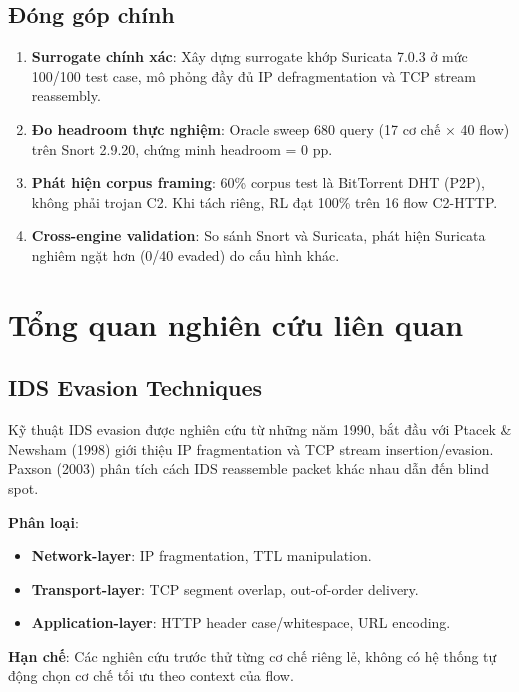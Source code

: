 \documentclass[12pt, a4paper, openany]{book}
\begin{document}
\section{Đóng góp chính}

\begin{enumerate}
    \item \textbf{Surrogate chính xác}: Xây dựng surrogate khớp Suricata 7.0.3 ở mức 100/100 test case, mô phỏng đầy đủ IP defragmentation và TCP stream reassembly.
    
    \item \textbf{Đo headroom thực nghiệm}: Oracle sweep 680 query (17 cơ chế × 40 flow) trên Snort 2.9.20, chứng minh headroom = 0 pp.
    
    \item \textbf{Phát hiện corpus framing}: 60\% corpus test là BitTorrent DHT (P2P), không phải trojan C2. Khi tách riêng, RL đạt 100\% trên 16 flow C2-HTTP.
    
    \item \textbf{Cross-engine validation}: So sánh Snort và Suricata, phát hiện Suricata nghiêm ngặt hơn (0/40 evaded) do cấu hình khác.
\end{enumerate}

\chapter{Tổng quan nghiên cứu liên quan}

\section{IDS Evasion Techniques}

Kỹ thuật IDS evasion được nghiên cứu từ những năm 1990, bắt đầu với Ptacek \& Newsham (1998) giới thiệu IP fragmentation và TCP stream insertion/evasion. Paxson (2003) phân tích cách IDS reassemble packet khác nhau dẫn đến blind spot.

\textbf{Phân loại}:
\begin{itemize}
    \item \textbf{Network-layer}: IP fragmentation, TTL manipulation.
    \item \textbf{Transport-layer}: TCP segment overlap, out-of-order delivery.
    \item \textbf{Application-layer}: HTTP header case/whitespace, URL encoding.
\end{itemize}

\textbf{Hạn chế}: Các nghiên cứu trước thử từng cơ chế riêng lẻ, không có hệ thống tự động chọn cơ chế tối ưu theo context của flow.
\end{document}

